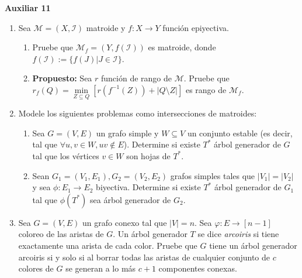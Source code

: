 

\header
\begin{center}
	\LARGE \bf{Auxiliar 11}
\end{center}

\begin{enumerate}[label ={\bf P\arabic*}]
	\item Sea $\mathcal{M} = (X,\mathcal{I})$ matroide y $f:X\to Y$ función epiyectiva. \begin{enumerate}
        \item Pruebe que $\mathcal{M}_f = (Y, f(\mathcal{I}))$ es matroide, donde $f(\mathcal{I}) := \{f(J) | J \in \mathcal{I}\}$. 
        \item \textbf{Propuesto:} Sea $r$ función de rango de $\mathcal{M}$. Pruebe que \\$r_f(Q) = \min\limits_{Z\subseteq Q} [r(f^{-1}(Z)) + |Q\setminus Z|]$ es rango de $\mathcal{M}_f$.
    \end{enumerate}
    \item Modele los siguientes problemas como intersecciones de matroides:\begin{enumerate}
        \item Sea $G=(V,E)$ un grafo simple y $W\subseteq V$ un conjunto estable (es decir, tal que $\forall u,v\in W, uv\notin E$). Determine si existe $T^*$ árbol generador de $G$ tal que los vértices $v\in W$ son hojas de $T^*$.
        \item Sean $G_1=(V_1,E_1), G_2=(V_2,E_2)$ grafos simples tales que $|V_1|=|V_2|$ y sea $\phi: E_1\to E_2$ biyectiva. Determine si existe $T^*$ árbol generador de $G_1$ tal que $\phi(T^*)$ sea árbol generador de $G_2$.
    \end{enumerate}
    \item Sea $G=(V,E)$ un grafo conexo tal que $|V|=n$. Sea $\varphi:E\to[n-1]$ coloreo de las aristas de $G$. Un árbol generador $T$ se dice \textit{arcoiris} si tiene exactamente una arista de cada color. Pruebe que $G$ tiene un árbol generador arcoiris si y solo si al borrar todas las aristas de cualquier conjunto de $c$ colores de $G$ se generan a lo más $c+1$ componentes conexas.
\end{enumerate}
